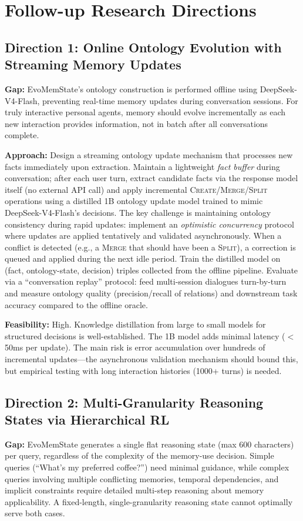 \documentclass[11pt,a4paper]{article}
\begin{document}
\section{Follow-up Research Directions}

\subsection{Direction 1: Online Ontology Evolution with Streaming Memory Updates}
\textbf{Gap:} EvoMemState's ontology construction is performed offline using DeepSeek-V4-Flash, preventing real-time memory updates during conversation sessions. For truly interactive personal agents, memory should evolve incrementally as each new interaction provides information, not in batch after all conversations complete.

\textbf{Approach:} Design a streaming ontology update mechanism that processes new facts immediately upon extraction. Maintain a lightweight \emph{fact buffer} during conversation; after each user turn, extract candidate facts via the response model itself (no external API call) and apply incremental \textsc{Create}/\textsc{Merge}/\textsc{Split} operations using a distilled 1B ontology update model trained to mimic DeepSeek-V4-Flash's decisions. The key challenge is maintaining ontology consistency during rapid updates: implement an \emph{optimistic concurrency} protocol where updates are applied tentatively and validated asynchronously. When a conflict is detected (e.g., a \textsc{Merge} that should have been a \textsc{Split}), a correction is queued and applied during the next idle period. Train the distilled model on (fact, ontology-state, decision) triples collected from the offline pipeline. Evaluate via a ``conversation replay'' protocol: feed multi-session dialogues turn-by-turn and measure ontology quality (precision/recall of relations) and downstream task accuracy compared to the offline oracle.

\textbf{Feasibility:} High. Knowledge distillation from large to small models for structured decisions is well-established. The 1B model adds minimal latency ($<$50ms per update). The main risk is error accumulation over hundreds of incremental updates---the asynchronous validation mechanism should bound this, but empirical testing with long interaction histories (1000+ turns) is needed.

\subsection{Direction 2: Multi-Granularity Reasoning States via Hierarchical RL}
\textbf{Gap:} EvoMemState generates a single flat reasoning state (max 600 characters) per query, regardless of the complexity of the memory-use decision. Simple queries (``What's my preferred coffee?'') need minimal guidance, while complex queries involving multiple conflicting memories, temporal dependencies, and implicit constraints require detailed multi-step reasoning about memory applicability. A fixed-length, single-granularity reasoning state cannot optimally serve both cases.
\end{document}
